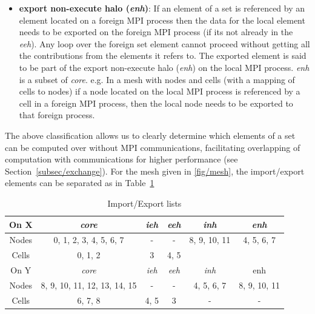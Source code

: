 \documentclass[11pt]{article}
\begin{document}
\begin{itemize}
\item \textbf{export non-execute halo (\textit{enh})}: If an element of a set is
referenced by an element located on a foreign MPI process then the data for the
local element needs to be exported on the foreign MPI process (if its not
already in the \textit{eeh}). Any loop over the foreign set element cannot
proceed without getting all the contributions from the elements it refers to.
The exported element is said to be part of the export non-execute halo
(\textit{enh}) on the local MPI process. \textit{enh} is a subset of
\textit{core}. e.g. In a mesh with nodes and cells (with a mapping of cells to
nodes) if a node located on the local MPI process is referenced by a cell in a
foreign MPI process, then the local node needs to be exported to that foreign
process.
\end{itemize}

\noindent The above classification allows us to clearly determine which elements
of a set can be computed over without MPI communications, facilitating
overlapping of computation with communications for higher performance (see
Section~\ref{subsec/exchange}). For the mesh given in \figurename{
\ref{fig/mesh}}, the import/export elements can be separated as in Table~\ref{tab/impexp}


\begin{table}[ht]
\centering\vspace{-10pt}
\caption{Import/Export lists}\small
\begin{tabular}{|c|c|c|c|c|c|} \hline
On X 	& \textit{core}	& \textit{ieh}	& \textit{eeh} 	& \textit{inh}	&
\textit{enh} 	\\\hline
Nodes	& 0, 1, 2, 3, 4, 5, 6, 7	& -	& -	& 8, 9, 10, 11	& 4, 5,
6, 7	\\\hline
Cells	& 0, 1, 2			& 3	& 4, 5	&	&\\\hline\hline
On Y 	& \textit{core}	& \textit{ieh}	& \textit{eeh}	& \textit{inh} & enh
\\\hline
Nodes	& 8, 9, 10, 11, 12, 13, 14, 15	& -	& -	& 4, 5, 6, 7	& 8, 9,
10, 11 	\\\hline
Cells	& 6, 7, 8	& 4, 5	& 3	& -		& - \\\hline
\end{tabular}\label{tab/impexp}\vspace{-0pt}
\end{table}\normalsize
\end{document}
